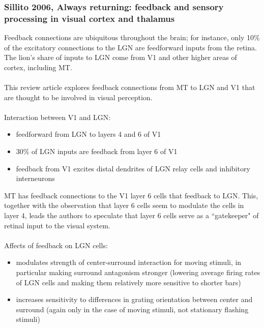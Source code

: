 \documentclass{article}
\begin{document}
\subsubsection{Sillito 2006, Always returning: feedback and sensory processing in visual cortex and thalamus}
Feedback connections are ubiquitous throughout the brain; for instance, only 10\% of the excitatory connections to the LGN are feedforward inputs from the retina.  The lion's share of inputs to LGN come from V1 and other higher areas of cortex, including MT.\\
\\
This review article explores feedback connections from MT to LGN and V1 that are thought to be involved in visual perception.\\
\\
Interaction between V1 and LGN:
\begin{itemize}
\item feedforward from LGN to layers 4 and 6 of V1
\item 30\% of LGN inputs are feedback from layer 6 of V1
\item feedback from V1 excites distal dendrites of LGN relay cells and inhibitory interneurons
\end{itemize}
MT has feedback connections to the V1 layer 6 cells that feedback to LGN.  This, together with the observation that layer 6 cells seem to modulate the cells in layer 4, leads the authors to speculate that layer 6 cells serve as a ``gatekeeper" of retinal input to the visual system.\\
\\
Affects of feedback on LGN cells:
\begin{itemize}
\item modulates strength of center-surround interaction for moving stimuli, in particular making surround antagonism stronger (lowering average firing rates of LGN cells and making them relatively more sensitive to shorter bars)
\item increases sensitivity to differences in grating orientation between center and surround (again only in the case of moving stimuli, not stationary flashing stimuli)
\end{itemize}
\end{document}
